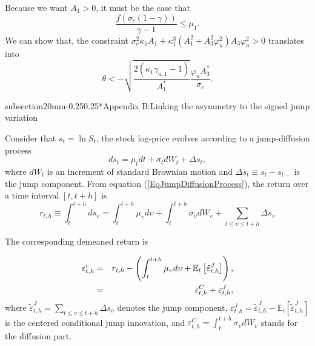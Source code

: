 \documentclass[11pt]{article}
\makeatletter
\renewcommand\subsection{\@startsection%
    {subsection}{2}{0mm}{-0.25\baselineskip}{0.25\baselineskip}{\bfseries\large}}
\makeatother
\begin{document}
\begin{small}
Because we want $A_{1}>0$, it must be the case that%
\begin{equation*}
\frac{f\left( \sigma _{c}(1-\gamma )\right) }{\gamma -1}\leq \mu _{1}.
\end{equation*}%
We can show that, the constraint $\sigma _{c}^{2}\kappa _{1}A_{1}+\kappa
_{1}^{3}\left( A_{1}^{2}+A_{3}^{2}\varphi _{u}^{2}\right) A_{3}\varphi
_{u}^{2}>0$ translates into%
\begin{equation*}
\theta <-\sqrt{\frac{2\left( \kappa _{1}\gamma _{u,1}-1\right) }{A_{1}^{\ast
}}}\frac{\varphi _{u}A_{3}^{\ast }}{\sigma _{c}}.
\end{equation*}


\subsection*{Appendix B:Linking the asymmetry to the signed jump variation}

Consider that $s_{t}=\ln S_{t}$, the stock log-price evolves according to a jump-diffusion process
\begin{equation}
    ds_{t}=\mu_{t}dt+\sigma_{t}dW_{t}+\Delta s_{t}, \label{EqJumpDiffusionProcess}
\end{equation}
where $dW_{t}$ is an increment of standard Brownian motion and $\Delta s_{t}\equiv s_{t}-s_{t-}$ is the jump component.
From equation (\ref{EqJumpDiffusionProcess}), the return over a time interval $\left[ t,t+h \right]$ is
\begin{equation}
    r_{t,h} \equiv \int_{t}^{t+h} ds_{\upsilon} = \int_{t}^{t+h} \mu_{\upsilon} d\upsilon + \int_{t}^{t+h} \sigma_{\upsilon}dW_{\upsilon} + \sum_{t \leq \upsilon \leq t+h } \Delta s_{\upsilon} \label{EqJumpDiffusionProcessRet}
\end{equation}

The corresponding demeaned return is

\begin{eqnarray}
    \varepsilon_{t,h}^{r}&=& r_{t,h}- \left( \int_{t}^{t+h} \mu_{\upsilon} d\upsilon + \mathbb{E}_{t} \left[ \tilde{\varepsilon}_{t,h}^{J}  \right] \right),  \notag \\
    &=& \varepsilon_{t,h}^{C}+\varepsilon_{t,h}^{J}, \label{EqJumpDiffusionProcessRetSchock}
\end{eqnarray}
where $ \tilde{\varepsilon}_{t,h}^{J} = \sum_{t \leq \upsilon \leq t+h } \Delta s_{\upsilon} $ denotes the jump component, $ \varepsilon_{t,h}^{J} = \tilde{\varepsilon}_{t,h}^{J} - \mathbb{E}_{t} \left[ \tilde{\varepsilon}_{t,h}^{J}  \right]$ is the centered conditional jump innovation, and $\varepsilon_{t,h}^{C}=\int_{t}^{t+h} \sigma_{\upsilon}dW_{\upsilon}$ stands for the diffusion part.


\end{small}
\end{document}
